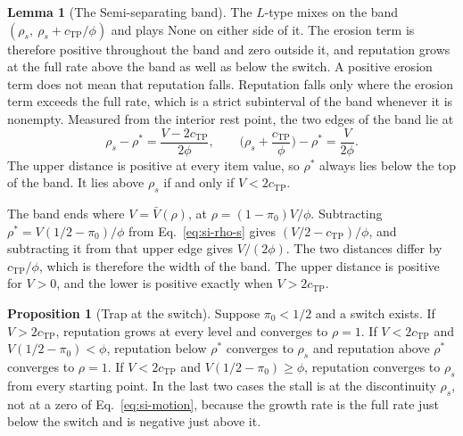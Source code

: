 \documentclass[11pt,letterpaper]{article}
\theoremstyle{definition}
\newtheorem{proposition}{Proposition}[section]
\newtheorem{lemma}{Lemma}[section]
\begin{document}
\begin{lemma}[The Semi-separating band]\label{lem:dyn-band}
The $L$-type mixes on the band $(\rho_s,\ \rho_s + c_{\text{TP}}/\phi)$ and
plays None on either side of it. The erosion term is therefore positive
throughout the band and zero outside it, and reputation grows at the full rate above the band as well as below the switch. A positive erosion term does not mean that reputation falls. Reputation falls only where the erosion term exceeds the full rate, which is a strict subinterval of the band whenever it is
nonempty. Measured from the interior rest point, the two edges of the band lie
at
\begin{equation*}
\rho_s - \rho^{*} = \frac{V - 2c_{\text{TP}}}{2\phi} ,
\qquad
\Big(\rho_s + \frac{c_{\text{TP}}}{\phi}\Big) - \rho^{*} = \frac{V}{2\phi} .
\end{equation*}
The upper distance is positive at every item value, so $\rho^{*}$ always lies
below the top of the band. It lies above $\rho_s$ if and only if
$V < 2c_{\text{TP}}$.
\end{lemma}

The band ends where $V = \bar{V}(\rho)$, at $\rho = (1 - \pi_0)V/\phi$.
Subtracting $\rho^{*} = V(1/2 - \pi_0)/\phi$ from Eq.~\ref{eq:si-rho-s} gives
$(V/2 - c_{\text{TP}})/\phi$, and subtracting it from that upper edge gives
$V/(2\phi)$. The two distances differ by $c_{\text{TP}}/\phi$, which is
therefore the width of the band. The upper distance is positive for $V > 0$, and
the lower is positive exactly when $V > 2c_{\text{TP}}$.

\begin{proposition}[Trap at the switch]\label{prop:dyn-trap}
Suppose $\pi_0 < 1/2$ and a switch exists. If $V > 2c_{\text{TP}}$, reputation grows at every level and converges to $\rho = 1$. If $V < 2c_{\text{TP}}$
and $V(1/2 - \pi_0) < \phi$, reputation below $\rho^{*}$ converges to $\rho_s$ and reputation above $\rho^{*}$ converges to $\rho = 1$. If $V < 2c_{\text{TP}}$ and
$V(1/2 - \pi_0) \geq \phi$, reputation converges to $\rho_s$ from every starting point. In the last two
cases the stall is at the discontinuity $\rho_s$, not at a zero of
Eq.~\ref{eq:si-motion}, because the growth rate is the full rate just below the
switch and is negative just above it.
\end{proposition}
\end{document}
